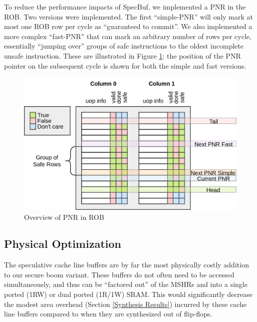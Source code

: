To reduce the performance impacts of SpecBuf, we implemented a PNR in the ROB. Two versions were implemented. The first ``simple-PNR'' will only mark at most one ROB row per cycle as ``guaranteed to commit''. We also implemented a more complex ``fast-PNR'' that can mark an arbitrary number of rows per cycle, essentially ``jumping over'' groups of safe instructions to the oldest incomplete unsafe instruction. These are illustrated in Figure \ref{PNR}: the position of the PNR pointer on the subsequent cycle is shown for both the simple and fast versions.

\begin{figure}[h]
  \begin{center}\includegraphics[scale=0.17]{rob_pnr.png}\end{center}
  \caption{Overview of PNR in ROB}
  \label{PNR}
\end{figure}

\subsection{Physical Optimization}
The speculative cache line buffers are by far the most physically costly addition to our secure boom variant. These buffers do not often need to be accessed simultaneously, and thus can be ``factored out'' of the MSHRs and into a single ported (1RW) or dual ported (1R/1W) SRAM. This would significantly decrease the modest area overhead (Section \ref{Synthesis Results}) incurred by these cache line buffers compared to when they are synthesized out of flip-flops.

